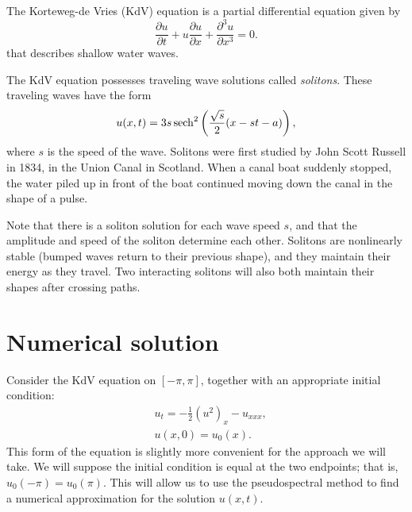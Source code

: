 \label{lab:solitons}


The Korteweg-de Vries (KdV) equation is a partial differential equation given by 
\[  \frac{\partial u }{\partial t} + u \frac{\partial u}{\partial x} + \frac{\partial^3 u}{\partial x^3} = 0.
\]
that describes shallow water waves. 

The KdV equation possesses traveling wave solutions called \emph{solitons}.  
These traveling waves have the form 
\[ u(x,t) = 3s \operatorname{sech}^2\left(\frac{\sqrt{s}}{2}(x - st - a)\right),
\]
where $s$ is the speed of the wave. 
Solitons were first studied by John Scott Russell in 1834, in the Union Canal in Scotland. 
When a canal boat suddenly stopped, the water piled up in front of the boat continued moving down the canal in the shape of a pulse.  

Note that there is a soliton solution for each wave speed $s$, and that the amplitude and speed of the soliton determine each other. 
Solitons are nonlinearly stable (bumped waves return to their previous shape), and they maintain their energy as they travel. 
Two interacting solitons will also both maintain their shapes after crossing paths. 

\section*{Numerical solution}
Consider the KdV equation on $[-\pi,\pi]$, together with an appropriate initial condition: 
\begin{align*}
	 &{ }u_t = -\frac{1}{2}\left(u^2 \right)_x - u_{xxx},\\
     &{ }u(x,0) = u_0(x).
\end{align*} 
This form of the equation is slightly more convenient for the approach we will take.
We will suppose the initial condition is equal at the two endpoints; that is, \(u_0(-\pi)=u_0(\pi)\).
This will allow us to use the pseudospectral method to find a numerical approximation for the solution $u(x,t)$.

